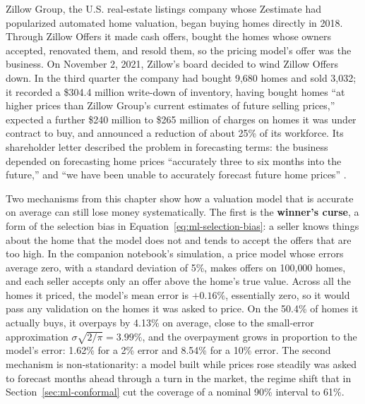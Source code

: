 \documentclass[../ai_in_finance]{subfiles}
\begin{document}
\label{sec:ml-zillow-vignette}

Zillow Group, the U.S. real-estate listings company whose Zestimate had popularized automated home valuation, began buying homes directly in 2018. Through Zillow Offers it made cash offers, bought the homes whose owners accepted, renovated them, and resold them, so the pricing model's offer was the business. On November 2, 2021, Zillow's board decided to wind Zillow Offers down. In the third quarter the company had bought 9,680 homes and sold 3,032; it recorded a \$304.4 million write-down of inventory, having bought homes ``at higher prices than Zillow Group's current estimates of future selling prices,'' expected a further \$240 million to \$265 million of charges on homes it was under contract to buy, and announced a reduction of about 25\% of its workforce. Its shareholder letter described the problem in forecasting terms: the business depended on forecasting home prices ``accurately three to six months into the future,'' and ``we have been unable to accurately forecast future home prices'' \parencite{zillow2021q3letter}.

Two mechanisms from this chapter show how a valuation model that is accurate on average can still lose money systematically. The first is the \textbf{winner's curse}, a form of the selection bias in Equation~\eqref{eq:ml-selection-bias}: a seller knows things about the home that the model does not and tends to accept the offers that are too high. In the companion notebook's simulation, a price model whose errors average zero, with a standard deviation of 5\%, makes offers on 100{,}000 homes, and each seller accepts only an offer above the home's true value. Across all the homes it priced, the model's mean error is $+0.16\%$, essentially zero, so it would pass any validation on the homes it was asked to price. On the 50.4\% of homes it actually buys, it overpays by 4.13\% on average, close to the small-error approximation $\sigma\sqrt{2/\pi} = 3.99\%$, and the overpayment grows in proportion to the model's error: 1.62\% for a 2\% error and 8.54\% for a 10\% error. The second mechanism is non-stationarity: a model built while prices rose steadily was asked to forecast months ahead through a turn in the market, the regime shift that in Section~\ref{sec:ml-conformal} cut the coverage of a nominal 90\% interval to 61\%.
\end{document}
